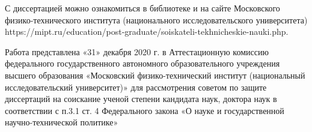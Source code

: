 С диссертацией можно ознакомиться в библиотеке и на сайте Московского физико-технического института (национального исследовательского университета)
https://mipt.ru/education/post-graduate/soiskateli-tekhnicheskie-nauki.php.

{
	\vskip 50mm
}

Работа представлена «31» декабря 2020 г. в Аттестационную комиссию федерального государственного автономного образовательного учреждения высшего
образования «Московский физико-технический институт (национальный исследовательский университет)» для рассмотрения советом по защите диссертаций на
соискание ученой степени кандидата наук, доктора наук в соответствии с п.3.1 ст. 4
Федерального закона «О науке и государственной научно-технической политике»





